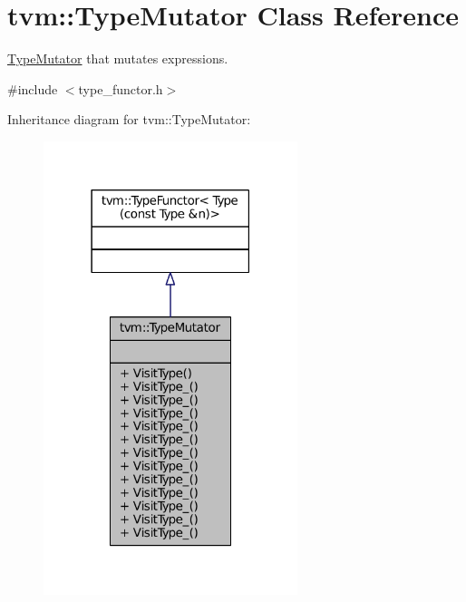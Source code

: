 \hypertarget{classtvm_1_1TypeMutator}{}\section{tvm\+:\+:Type\+Mutator Class Reference}
\label{classtvm_1_1TypeMutator}


\hyperlink{classtvm_1_1TypeMutator}{Type\+Mutator} that mutates expressions.  




{\ttfamily \#include $<$type\+\_\+functor.\+h$>$}



Inheritance diagram for tvm\+:\+:Type\+Mutator\+:
\nopagebreak
\begin{figure}[H]
\begin{center}
\leavevmode
\includegraphics[width=210pt]{classtvm_1_1TypeMutator__inherit__graph}
\end{center}
\end{figure}


